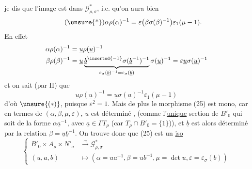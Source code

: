 je dis que l'image est dans $\mathcal G^*_{\rho,\sigma}$, i.e.
qu'on aura bien
\[
\tag{\unsure{*}}
\alpha\rho(\alpha)^{-1}
=\varepsilon\bigl(\beta\sigma(\beta)^{-1}\bigr)\varepsilon_1(\mu-1).
\]
En effet
\[
\begin{aligned}
\alpha\rho(\alpha)^{-1}&=\underline u\rho(\underline u)^{-1}\\
\beta\rho(\beta)^{-1}
&=\underline u\underbrace{
\underline b^{\inserted{-1}}\sigma(\underline b^{-1})^{-1}
}_{\varepsilon_\sigma(\underline b)^{-1}=\varepsilon_\sigma(\underline b)}
\sigma(\underline u)^{-1}
=\varepsilon\underline u\sigma(\underline u)^{-1}
\end{aligned}
\]
et on sait (par II) que
\[
\underline u\rho(\underline u)^{-1}
=\underline u\sigma(\underline u)^{-1}\varepsilon_1(\mu-1)
\]
d'où $\unsure{(*)}$, puisque $\varepsilon^2=1$. Mais de
plus le morphisme (25) est mono, 
car en termes de $(\alpha,\beta,\mu,\varepsilon)$, $u$ est déterminé
,
(comme l'\uline{unique} section de $B'_0$ qui
soit de la forme $\alpha\underline a^{-1}$, avec $\underline a\in\Gamma T_\rho$
(car $T_\rho\cap B'_0=\{1\}$)), et $\underline b$ est alors déterminé
par la relation $\beta=\underline u\underline b^{-1}$. On trouve
donc que (25) est un \uline{iso}
\[
\tag{26}
\left\{\begin{aligned}
B'_0\times A_\rho\times N'_\sigma
&\overset{\sim}{\longrightarrow}\mathcal G^*_{\rho,\sigma}\\
(\underline u,\underline a,\underline b)
&\longmapsto
(\alpha=\underline u\underline a^{-1},\beta=\underline u\underline b^{-1},
\mu=\det\underline u,\varepsilon=\varepsilon_\sigma(\underline b))
\end{aligned}\right.
\]


